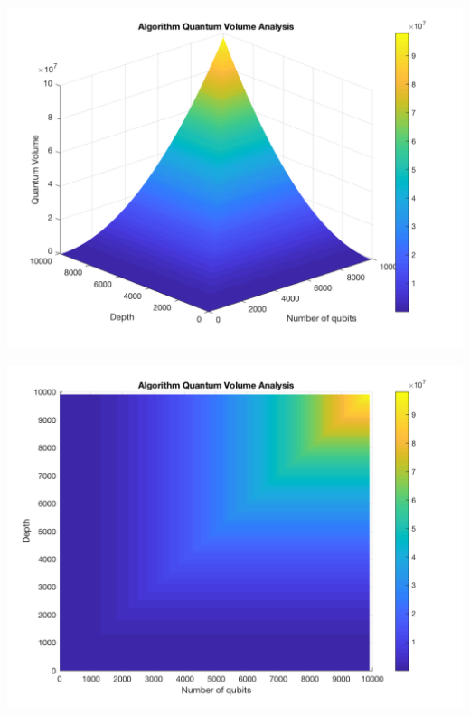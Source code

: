 \documentclass[11pt]{article}
\begin{document}
\begin{minipage}{.45\textwidth}

\centering

\begin{center}
\includegraphics[width=.9\linewidth]{V_q_analysis_sym2.png}
\end{center}

\label{fig:algorithmQV2sym}

\end{minipage}%
\hspace{1cm}
\begin{minipage}{.45\textwidth}

\begin{center}
\includegraphics[width=.9\linewidth]{V_q_analysis_sym1.png}
\end{center}

\label{fig:algorithmQV1sym}

\end{minipage}%
\end{document}
